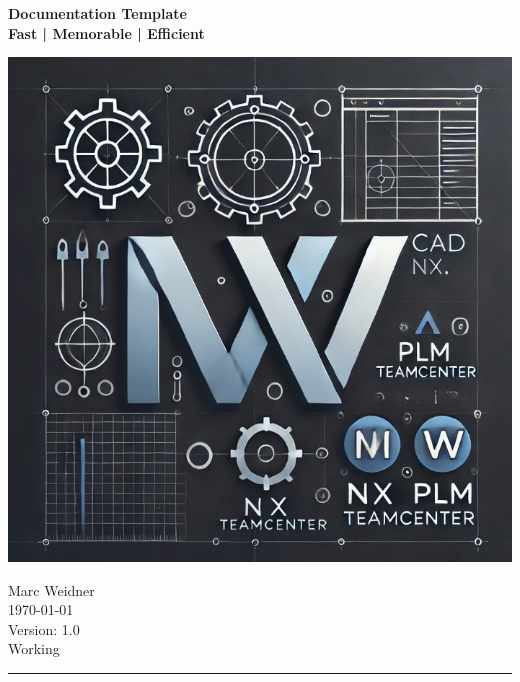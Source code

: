 \documentclass{scrartcl}
\begin{document}

\begin{titlepage}
	\begingroup
	\raggedright
	\textbf{{\LARGE Documentation Template}}\\
	\textbf{{\small Fast | Memorable | Efficient}}
	\endgroup
	
	\vfill
	
	\begin{center}
		\includegraphics[width=16cm]{pics/logo} %
	\end{center}
	
	\vfill
	
	\begin{flushright}
		Marc Weidner\\
		\today\\    
		Version: 1.0\\
		Working\\
		\rule{0.2\linewidth}{1pt} %
	\end{flushright}
	
\end{titlepage}



	
\tableofcontents
	\pagebreak


\listoffigures


\end{document}
